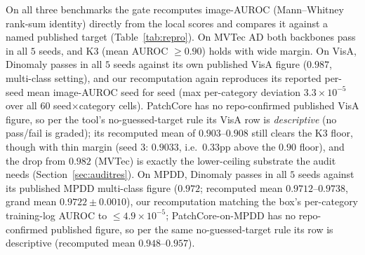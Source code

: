 \documentclass[preprint,11pt]{elsarticle}
\begin{document}
On all three benchmarks the gate recomputes image-AUROC (Mann--Whitney rank-sum identity) directly
from the local scores and compares it against a named published target (Table~\ref{tab:repro}).
On MVTec AD both backbones pass in all $5$ seeds, and K3 (mean AUROC $\ge 0.90$) holds with wide
margin. On VisA, Dinomaly passes in all $5$ seeds against its own published VisA figure
($0.987$, multi-class setting), and our recomputation again reproduces its reported per-seed
mean image-AUROC seed for seed (max per-category deviation $3.3\times 10^{-5}$ over
all $60$ seed$\times$category cells). PatchCore has no repo-confirmed published VisA figure, so
per the tool's no-guessed-target rule its VisA row is \emph{descriptive} (no pass/fail is
graded); its recomputed mean of $0.903$--$0.908$ still clears the K3 floor, though with thin
margin (seed $3$: $0.9033$, i.e.\ $0.33$pp above the $0.90$ floor), and the drop from $0.982$
(MVTec) is exactly the lower-ceiling substrate the audit needs (Section~\ref{sec:auditres}). On
MPDD, Dinomaly passes in all $5$ seeds against its published MPDD multi-class figure ($0.972$;
recomputed mean $0.9712$--$0.9738$, grand mean $0.9722 \pm 0.0010$), our recomputation matching
the box's per-category training-log AUROC to $\le 4.9\times10^{-5}$; PatchCore-on-MPDD has no
repo-confirmed published figure, so per the same no-guessed-target rule its row is
descriptive (recomputed mean $0.948$--$0.957$).
\end{document}
